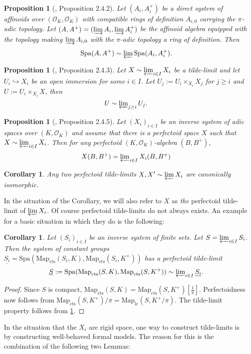 \documentclass[10pt,oneside]{amsart}
\newtheorem{proposition}[theorem]{Proposition}
\newtheorem{corollary}[theorem]{Corollary}
\theoremstyle{definition}
\begin{document}
\begin{proposition}[\cite{SW}, Proposition 2.4.2]\label{SW Proposition 2.4.2}
	Let $(A_i,A_i^{+})$ be a direct system of affinoids over $(\mathcal O_K,\mathcal O_K)$ with compatible rings of definition $A_{i,0}$ carrying the $\pi$-adic topology. Let $(A,A^{+})=(\varinjlim A_i,\varinjlim A_i^{+})$ be the affinoid algebra equipped with the topology making $\varinjlim A_{i,0}$ with the $\pi$-adic topology a ring of definition. Then
	\[\operatorname{Spa}(A,A^{+})\sim \textstyle\varprojlim \operatorname{Spa}(A_i,A_i^{+}).\]
\end{proposition}
\begin{proposition}[\cite{SW}, Proposition 2.4.3]\label{SW Proposition 2.4.3}
	Let $X\sim \varprojlim_{i\in I} X_i$ be a tilde-limit and let $U_i\hookrightarrow X_i$ be an open immersion for some $i\in I$. Let $U_j:=U_i\times_{X_i}X_j$ for $j\geq i$ and $U:=U_i\times_{X_i}X$, then 
	\[U\sim \textstyle\varprojlim_{j\geq i} U_j.\]
\end{proposition}

\begin{proposition}[\cite{SW}, Proposition 2.4.5]\label{SW Proposition 2.4.5}
	Let $(X_i)_{i\in I}$ be an inverse system of adic spaces over $(K,\mathcal O_K)$ and assume that there is a perfectoid space $X$ such that $X\sim \varprojlim_{i\in I} X_i$. Then for any perfectoid $(K,\mathcal O_K)$-algebra $(B,B^{+})$, 
	\[X(B,B^{+})  = \textstyle\varprojlim_{i\in I}X_i(B,B^{+})\]
\end{proposition}
\begin{corollary}\label{corollary: perfectoid tilde limit is unique}
	Any two perfectoid tilde-limits $X,X'\sim \varprojlim X_i$ are canonically isomorphic.
\end{corollary}
In the situation of the Corollary, we will also refer to $X$ as \textit{the} perfectoid tilde-limit of $\varprojlim X_i$. Of course perfectoid tilde-limits do not always exists. An example for a basic situation in which they do is the following:
\begin{corollary}\label{pro-finite-perfectoid-spaces}
	Let $(S_i)_{i\in I}$ be an inverse system of finite sets. Let $S=\varprojlim_{i\in I} S_i$. Then the system of constant groups $\underline{S_i}=\mathrm{Spa}(\mathrm{Map}_{\mathrm{cts}}(S_i,K),\mathrm{Map}_{\mathrm{cts}}(S_i,K^+))$ has a perfectoid tilde-limit	\[\underline{S}:=\mathrm{Spa}(\mathrm{Map}_{\mathrm{cts}}(S,K),\mathrm{Map}_{\mathrm{cts}}(S,K^+))\sim\textstyle\varprojlim_{i\in I} \underline{S_i}.\]
\end{corollary}
\begin{proof}
	Since $S$ is compact, $\mathrm{Map}_{\mathrm{cts}}(S,K)=\mathrm{Map}_{\mathrm{cts}}(S,K^+)[\tfrac{1}{\pi}]$. Perfectoidness now follows from $\mathrm{Map}_{\mathrm{cts}}(S,K^+)/\pi=\mathrm{Map}_{\mathrm{lc}}(S,K^+/\pi)$. The tilde-limit property follows from \ref{SW Proposition 2.4.2}.
\end{proof}
In the situation that the $X_i$ are rigid space, one way to construct tilde-limits is by constructing well-behaved formal models. The reason for this is the combination of the following two Lemmas:
\end{document}
